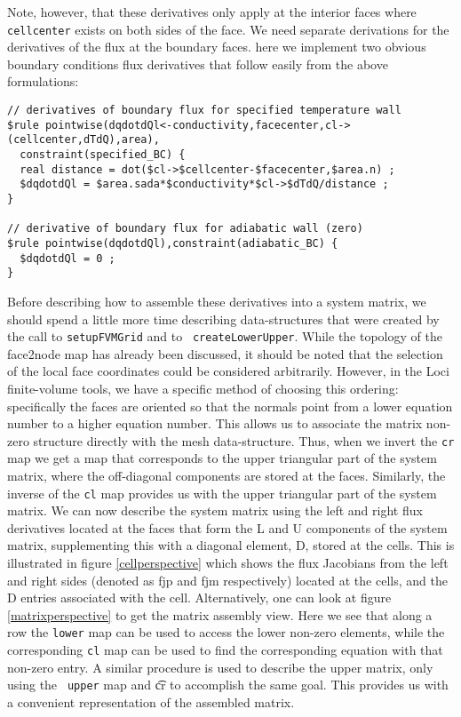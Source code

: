\documentclass[10pt,epsf,letterpaper,twoside]{book}
\begin{document}
Note, however, that these derivatives only apply at the interior faces
where {\tt cellcenter} exists on both sides of the face.  We need
separate derivations for the derivatives of the flux at the boundary
faces.  here we implement two obvious boundary conditions flux
derivatives that follow easily from the above formulations:

\begin{verbatim}
// derivatives of boundary flux for specified temperature wall
$rule pointwise(dqdotdQl<-conductivity,facecenter,cl->(cellcenter,dTdQ),area),
  constraint(specified_BC) {
  real distance = dot($cl->$cellcenter-$facecenter,$area.n) ;
  $dqdotdQl = $area.sada*$conductivity*$cl->$dTdQ/distance ;
}

// derivative of boundary flux for adiabatic wall (zero)
$rule pointwise(dqdotdQl),constraint(adiabatic_BC) {
  $dqdotdQl = 0 ;
}
\end{verbatim}

Before describing how to assemble these derivatives into a system
matrix, we should spend a little more time describing data-structures
that were created by the call to {\tt setupFVMGrid} and to {\tt
  createLowerUpper}.  While the topology of the face2node map has
already been discussed, it should be noted that the selection of the
local face coordinates could be considered arbitrarily.  However, in
the Loci finite-volume tools, we have a specific method of choosing
this ordering: specifically the faces are oriented so that the normals
point from a lower equation number to a higher equation number.  This
allows us to associate the matrix non-zero structure directly with the
mesh data-structure.  Thus, when we invert the {\tt cr} map we get a
map that corresponds to the upper triangular part of the system
matrix, where the off-diagonal components are stored at the faces.
Similarly, the inverse of the {\tt cl} map provides us with the upper
triangular part of the system matrix.  We can now describe the system
matrix using the left and right flux derivatives located at the faces
that form the L and U components of the system matrix, supplementing
this with a diagonal element, D, stored at the cells.  This is
illustrated in figure \ref{cellperspective} which shows the flux
Jacobians from the left and right sides (denoted as fjp and fjm
respectively) located at the cells, and the D entries associated with
the cell.  Alternatively, one can look at figure
\ref{matrixperspective} to get the matrix assembly view.  Here we see
that along a row the {\tt lower} map can be used to access the lower
non-zero elements, while the corresponding {\tt cl} map can be used to
find the corresponding equation with that non-zero entry.  A similar
procedure is used to describe the upper matrix, only using the {\tt
  upper} map and {\t cr} to accomplish the same goal. This provides us
with a convenient representation of the assembled matrix.
\end{document}
